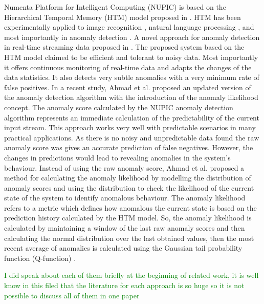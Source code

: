 \documentclass[sigconf]{acmart}
\begin{document}
 Numenta Platform for Intelligent Computing (NUPIC) is based on the Hierarchical Temporal Memory (HTM) model proposed in \cite{Hawkins:2007fi}. HTM has been experimentally applied to image recognition \cite{vskoviera2013image}, natural language processing \cite{arel2010deep}, and most importantly in anomaly detection \cite{ziabaryhlmt,DBLP:journals/corr/LavinA15,DBLP:journals/corr/AhmadP16}.
A novel approach for anomaly detection  in real-time streaming data proposed in \cite{DBLP:journals/corr/AhmadP16,DBLP:journals/corr/LavinA15}. The proposed system based on the HTM model claimed to be efficient and tolerant to noisy data. Most importantly it offers continuous monitoring of real-time data and adapts the changes of the data statistics. It also detects very subtle anomalies with a very minimum rate of false positives. In a recent study, Ahmad et al. \cite{AHMAD2017134} proposed an updated version of the anomaly detection algorithm with the introduction of the anomaly likelihood concept. 
The anomaly score calculated by the NUPIC anomaly detection algorithm represents an immediate calculation of the predictability of the current input stream. This approach works very well with predictable scenarios in many practical applications. As there is no noisy and unpredictable data found the raw anomaly score was gives an accurate prediction of false negatives. However, the changes in predictions would lead to revealing anomalies in the system’s behaviour. Instead of using the raw anomaly score, Ahmad et al. \cite{AHMAD2017134} proposed a method for calculating the anomaly likelihood by modelling the distribution of anomaly scores and using the distribution to check the likelihood of the current state of the system to identify anomalous behaviour. The anomaly likelihood refers to a metric which defines how anomalous the current state is based on the prediction history calculated by the HTM model. So, the anomaly likelihood is calculated by maintaining a window of the last raw anomaly scores and then calculating the normal distribution over the last obtained values, then the most recent average of anomalies is calculated using the Gaussian tail probability function (Q-function) \cite{craig1991new}.
 
\textcolor{green}{I did speak about each of them briefly at the beginning of related work, it is well know in this filed that the literature for each approach is so huge so it is not possible to discuss all of them in one paper}
\end{document}
